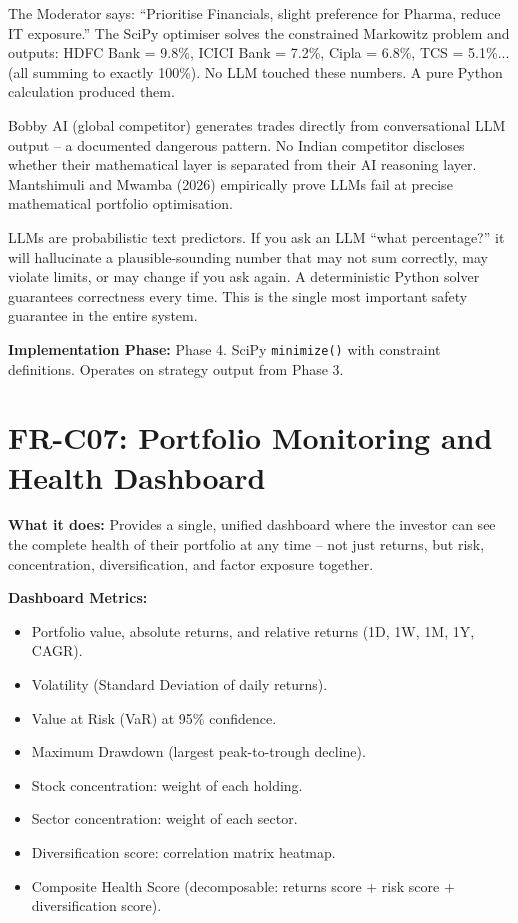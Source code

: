 \documentclass[12pt, a4paper, openany, oneside]{report}
\begin{document}
\begin{examplebox}
The Moderator says: ``Prioritise Financials, slight preference for Pharma, reduce IT exposure.'' The SciPy optimiser solves the constrained Markowitz problem and outputs: HDFC Bank = 9.8\%, ICICI Bank = 7.2\%, Cipla = 6.8\%, TCS = 5.1\%... (all summing to exactly 100\%). No LLM touched these numbers. A pure Python calculation produced them.
\end{examplebox}

\begin{gapbox}
Bobby AI (global competitor) generates trades directly from conversational LLM output -- a documented dangerous pattern. No Indian competitor discloses whether their mathematical layer is separated from their AI reasoning layer. Mantshimuli and Mwamba (2026) empirically prove LLMs fail at precise mathematical portfolio optimisation.
\end{gapbox}

\begin{valuebox}
LLMs are probabilistic text predictors. If you ask an LLM ``what percentage?'' it will hallucinate a plausible-sounding number that may not sum correctly, may violate limits, or may change if you ask again. A deterministic Python solver guarantees correctness every time. This is the single most important safety guarantee in the entire system.
\end{valuebox}

\textbf{Implementation Phase:} Phase 4. SciPy \texttt{minimize()} with constraint definitions. Operates on strategy output from Phase 3.

\section{FR-C07: Portfolio Monitoring and Health Dashboard}

\textbf{What it does:} Provides a single, unified dashboard where the investor can see the complete health of their portfolio at any time -- not just returns, but risk, concentration, diversification, and factor exposure together.

\textbf{Dashboard Metrics:}
\begin{itemize}
  \item Portfolio value, absolute returns, and relative returns (1D, 1W, 1M, 1Y, CAGR).
  \item Volatility (Standard Deviation of daily returns).
  \item Value at Risk (VaR) at 95\% confidence.
  \item Maximum Drawdown (largest peak-to-trough decline).
  \item Stock concentration: weight of each holding.
  \item Sector concentration: weight of each sector.
  \item Diversification score: correlation matrix heatmap.
  \item Composite Health Score (decomposable: returns score + risk score + diversification score).
\end{itemize}
\end{document}
